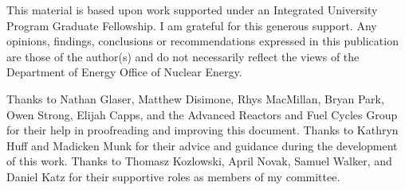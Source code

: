 This material is based upon work supported under an Integrated University Program Graduate Fellowship. I am grateful for this generous support. Any opinions, findings, conclusions or recommendations expressed in this publication are those of the author(s) and do not necessarily reflect the views of the Department of Energy Office of Nuclear Energy.

Thanks to Nathan Glaser, Matthew Disimone, Rhys MacMillan, Bryan Park, Owen Strong, Elijah Capps, and the Advanced Reactors and Fuel Cycles Group for their help in proofreading and improving this document.
Thanks to Kathryn Huff and Madicken Munk for their advice and guidance during the development of this work.
Thanks to Thomasz Kozlowski, April Novak, Samuel Walker, and Daniel Katz for their supportive roles as members of my committee.
